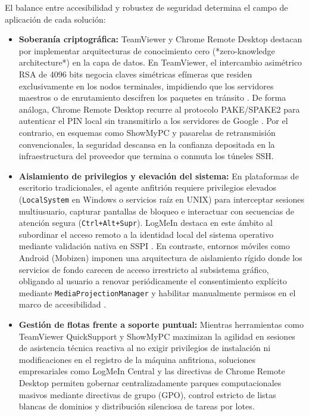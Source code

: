 \documentclass[12pt]{article}
\begin{document}
El balance entre accesibilidad y robustez de seguridad determina el campo de aplicación de cada solución:
\begin{itemize}[noitemsep, topsep=4pt]
    \item \textbf{Soberanía criptográfica:} TeamViewer y Chrome Remote Desktop destacan por implementar arquitecturas de conocimiento cero (*zero-knowledge architecture*) en la capa de datos. En TeamViewer, el intercambio asimétrico RSA de 4096 bits negocia claves simétricas efímeras que residen exclusivamente en los nodos terminales, impidiendo que los servidores maestros o de enrutamiento descifren los paquetes en tránsito \parencite{teamviewerSecurityWhitepaper}. De forma análoga, Chrome Remote Desktop recurre al protocolo PAKE/SPAKE2 para autenticar el PIN local sin transmitirlo a los servidores de Google \parencite{chromiumChromoting}. Por el contrario, en esquemas como ShowMyPC y pasarelas de retransmisión convencionales, la seguridad descansa en la confianza depositada en la infraestructura del proveedor que termina o conmuta los túneles SSH.
    \item \textbf{Aislamiento de privilegios y elevación del sistema:} En plataformas de escritorio tradicionales, el agente anfitrión requiere privilegios elevados (\texttt{LocalSystem} en Windows o servicios raíz en UNIX) para interceptar sesiones multiusuario, capturar pantallas de bloqueo e interactuar con secuencias de atención segura (\texttt{Ctrl+Alt+Supr}). LogMeIn destaca en este ámbito al subordinar el acceso remoto a la identidad local del sistema operativo mediante validación nativa en SSPI \parencite{gotoLogmeinSecurity}. En contraste, entornos móviles como Android (Mobizen) imponen una arquitectura de aislamiento rígido donde los servicios de fondo carecen de acceso irrestricto al subsistema gráfico, obligando al usuario a renovar periódicamente el consentimiento explícito mediante \texttt{MediaProjection}\allowbreak\texttt{Manager} \parencite{androidMediaProjection} y habilitar manualmente permisos en el marco de accesibilidad \parencite{androidAccessibilityGesture}.
    \item \textbf{Gestión de flotas frente a soporte puntual:} Mientras herramientas como TeamViewer QuickSupport y ShowMyPC maximizan la agilidad en sesiones de asistencia técnica reactiva al no exigir privilegios de instalación ni modificaciones en el registro de la máquina anfitriona, soluciones empresariales como LogMeIn Central y las directivas de Chrome Remote Desktop permiten gobernar centralizadamente parques computacionales masivos mediante directivas de grupo (GPO), control estricto de listas blancas de dominios y distribución silenciosa de tareas por lotes.
\end{itemize}
\end{document}
